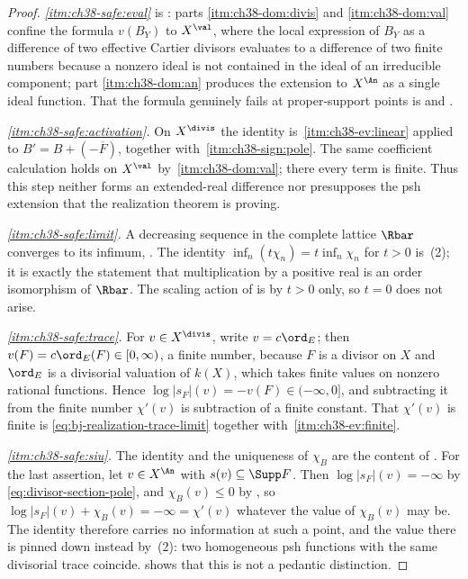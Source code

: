 \begin{proof}
\emph{\cref{itm:ch38-safe:eval}} is
: parts
\cref{itm:ch38-dom:divis} and \cref{itm:ch38-dom:val} confine the formula
$v(B_Y)$ to $X^{\val}$, where the local expression of $B_Y$ as a
difference of two effective Cartier divisors evaluates to a difference of
two finite numbers because a nonzero ideal is not contained in the ideal
of an irreducible component; part \cref{itm:ch38-dom:an} produces the
extension to $X^{\An}$ as a single ideal function.  That the formula
genuinely fails at proper-support points is
 and
.

\emph{\cref{itm:ch38-safe:activation}.}  On $X^{\divis}$ the identity is
\,\cref{itm:ch38-ev:linear} applied
to $B'=B+(-\overline F)$, together with
\,\cref{itm:ch38-sign:pole}.  The same
coefficient calculation holds on $X^{\val}$ by
\,\cref{itm:ch38-dom:val}; there every
term is finite.  Thus this step neither forms an extended-real difference
nor presupposes the psh extension that the realization theorem is proving.

\emph{\cref{itm:ch38-safe:limit}.}  A decreasing sequence in the complete
lattice $\Rbar$ converges to its infimum,
.  The identity
$\inf_n(t\chi_n)=t\inf_n\chi_n$ for $t>0$ is
\,(2); it is exactly the statement that
multiplication by a positive real is an order isomorphism of $\Rbar$.
The scaling action of  is by
$t>0$ only, so $t=0$ does not arise.

\emph{\cref{itm:ch38-safe:trace}.}  For $v\in X^{\divis}$, write
$v=c\ord_E$; then $v(F)=c\ord_E(F)\in[0,\infty)$, a finite number,
because $F$ is a divisor on $X$ and $\ord_E$ is a divisorial
valuation of $k(X)$, which takes finite values on nonzero rational
functions.  Hence $\log|s_F|(v)=-v(F)\in(-\infty,0]$, and subtracting it
from the finite number $\chi'(v)$ is subtraction of a finite constant.
That $\chi'(v)$ is finite is
\eqref{eq:bj-realization-trace-limit} together with
\,\cref{itm:ch38-ev:finite}.

\emph{\cref{itm:ch38-safe:siu}.}  The identity and the uniqueness of
$\chi_B$ are the content of
.  For the last assertion, let
$v\in X^{\An}$ with $s(v)\subseteq\Supp F$.  Then
$\log|s_F|(v)=-\infty$ by \eqref{eq:divisor-section-pole}, and
$\chi_B(v)\leq0$ by , so
$\log|s_F|(v)+\chi_B(v)=-\infty=\chi'(v)$ whatever the value of
$\chi_B(v)$ may be.  The identity therefore carries no information at
such a point, and the value there is pinned down instead by
\,(2): two homogeneous psh
functions with the same divisorial trace coincide.
 shows that this is not a
pedantic distinction.


\end{proof}
